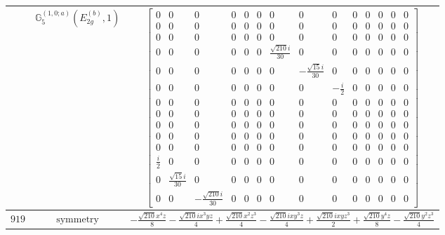 \documentclass[fleqn,8pt,landscape]{jsarticle}
\begin{document}
\begin{longtable}{ccc}
$  $ & $ \mathbb{G}_{5}^{(1,0;a)}(E_{2g}^{(b)},1) $ & $ \begin{bmatrix} 0 & 0 & 0 & 0 & 0 & 0 & 0 & 0 & 0 & 0 & 0 & 0 & 0 & 0 \\ 0 & 0 & 0 & 0 & 0 & 0 & 0 & 0 & 0 & 0 & 0 & 0 & 0 & 0 \\ 0 & 0 & 0 & 0 & 0 & 0 & 0 & 0 & 0 & 0 & 0 & 0 & 0 & 0 \\ 0 & 0 & 0 & 0 & 0 & 0 & \frac{\sqrt{210} i}{30} & 0 & 0 & 0 & 0 & 0 & 0 & 0 \\ 0 & 0 & 0 & 0 & 0 & 0 & 0 & - \frac{\sqrt{15} i}{30} & 0 & 0 & 0 & 0 & 0 & 0 \\ 0 & 0 & 0 & 0 & 0 & 0 & 0 & 0 & - \frac{i}{2} & 0 & 0 & 0 & 0 & 0 \\ 0 & 0 & 0 & 0 & 0 & 0 & 0 & 0 & 0 & 0 & 0 & 0 & 0 & 0 \\ 0 & 0 & 0 & 0 & 0 & 0 & 0 & 0 & 0 & 0 & 0 & 0 & 0 & 0 \\ 0 & 0 & 0 & 0 & 0 & 0 & 0 & 0 & 0 & 0 & 0 & 0 & 0 & 0 \\ 0 & 0 & 0 & 0 & 0 & 0 & 0 & 0 & 0 & 0 & 0 & 0 & 0 & 0 \\ 0 & 0 & 0 & 0 & 0 & 0 & 0 & 0 & 0 & 0 & 0 & 0 & 0 & 0 \\ \frac{i}{2} & 0 & 0 & 0 & 0 & 0 & 0 & 0 & 0 & 0 & 0 & 0 & 0 & 0 \\ 0 & \frac{\sqrt{15} i}{30} & 0 & 0 & 0 & 0 & 0 & 0 & 0 & 0 & 0 & 0 & 0 & 0 \\ 0 & 0 & - \frac{\sqrt{210} i}{30} & 0 & 0 & 0 & 0 & 0 & 0 & 0 & 0 & 0 & 0 & 0 \end{bmatrix} $ \\ \hline
$ 919 $ & $ \text{symmetry} $ & $ - \frac{\sqrt{210} x^{4} z}{8} - \frac{\sqrt{210} i x^{3} y z}{4} + \frac{\sqrt{210} x^{2} z^{3}}{4} - \frac{\sqrt{210} i x y^{3} z}{4} + \frac{\sqrt{210} i x y z^{3}}{2} + \frac{\sqrt{210} y^{4} z}{8} - \frac{\sqrt{210} y^{2} z^{3}}{4} $ \\

\end{longtable}
\end{document}
